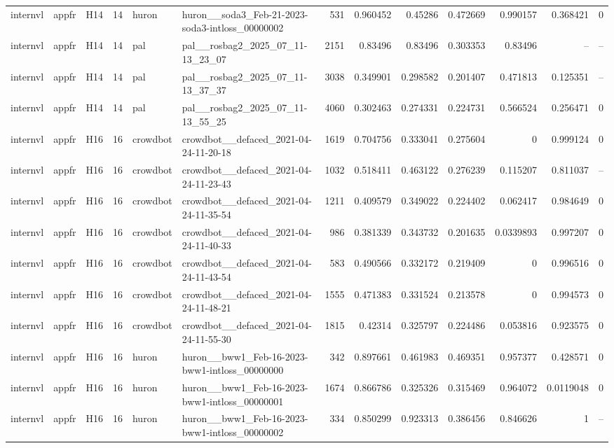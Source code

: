 \begin{longtable}{lllrllrrrrrrr}
internvl & appfr & H14 & 14 & huron & huron\_\_soda3\_Feb-21-2023-soda3-intloss\_00000002 & 531 & 0.960452 & 0.45286 & 0.472669 & 0.990157 & 0.368421 & 0 \\
internvl & appfr & H14 & 14 & pal & pal\_\_rosbag2\_2025\_07\_11-13\_23\_07 & 2151 & 0.83496 & 0.83496 & 0.303353 & 0.83496 & -- & -- \\
internvl & appfr & H14 & 14 & pal & pal\_\_rosbag2\_2025\_07\_11-13\_37\_37 & 3038 & 0.349901 & 0.298582 & 0.201407 & 0.471813 & 0.125351 & -- \\
internvl & appfr & H14 & 14 & pal & pal\_\_rosbag2\_2025\_07\_11-13\_55\_25 & 4060 & 0.302463 & 0.274331 & 0.224731 & 0.566524 & 0.256471 & 0 \\
internvl & appfr & H16 & 16 & crowdbot & crowdbot\_\_defaced\_2021-04-24-11-20-18 & 1619 & 0.704756 & 0.333041 & 0.275604 & 0 & 0.999124 & 0 \\
internvl & appfr & H16 & 16 & crowdbot & crowdbot\_\_defaced\_2021-04-24-11-23-43 & 1032 & 0.518411 & 0.463122 & 0.276239 & 0.115207 & 0.811037 & -- \\
internvl & appfr & H16 & 16 & crowdbot & crowdbot\_\_defaced\_2021-04-24-11-35-54 & 1211 & 0.409579 & 0.349022 & 0.224402 & 0.062417 & 0.984649 & 0 \\
internvl & appfr & H16 & 16 & crowdbot & crowdbot\_\_defaced\_2021-04-24-11-40-33 & 986 & 0.381339 & 0.343732 & 0.201635 & 0.0339893 & 0.997207 & 0 \\
internvl & appfr & H16 & 16 & crowdbot & crowdbot\_\_defaced\_2021-04-24-11-43-54 & 583 & 0.490566 & 0.332172 & 0.219409 & 0 & 0.996516 & 0 \\
internvl & appfr & H16 & 16 & crowdbot & crowdbot\_\_defaced\_2021-04-24-11-48-21 & 1555 & 0.471383 & 0.331524 & 0.213578 & 0 & 0.994573 & 0 \\
internvl & appfr & H16 & 16 & crowdbot & crowdbot\_\_defaced\_2021-04-24-11-55-30 & 1815 & 0.42314 & 0.325797 & 0.224486 & 0.053816 & 0.923575 & 0 \\
internvl & appfr & H16 & 16 & huron & huron\_\_bww1\_Feb-16-2023-bww1-intloss\_00000000 & 342 & 0.897661 & 0.461983 & 0.469351 & 0.957377 & 0.428571 & 0 \\
internvl & appfr & H16 & 16 & huron & huron\_\_bww1\_Feb-16-2023-bww1-intloss\_00000001 & 1674 & 0.866786 & 0.325326 & 0.315469 & 0.964072 & 0.0119048 & 0 \\
internvl & appfr & H16 & 16 & huron & huron\_\_bww1\_Feb-16-2023-bww1-intloss\_00000002 & 334 & 0.850299 & 0.923313 & 0.386456 & 0.846626 & 1 & -- \\

\end{longtable}
